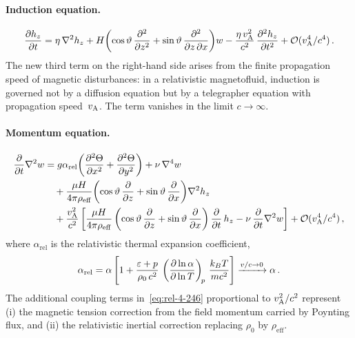 \paragraph{Induction equation.}
\begin{equation}
  \frac{\partial h_{z}}{\partial t}
  = \eta\,\nabla^{2}h_{z}
    + H\!\left(\cos\vartheta\,\frac{\partial^{2}}{\partial z^{2}}
              + \sin\vartheta\,\frac{\partial^{2}}{\partial z\,\partial x}\right)\!w
    - \frac{\eta\,v_{\mathrm{A}}^{2}}{c^{2}}\,
      \frac{\partial^{2} h_{z}}{\partial t^{2}}
    + \mathcal{O}(v_{\mathrm{A}}^{4}/c^{4})\,.
  \label{eq:rel-4-245}
\end{equation}
The new third term on the right-hand side arises from the finite
propagation speed of magnetic disturbances: in a relativistic
magnetofluid, induction is governed not by a diffusion equation but by a
telegrapher equation with propagation speed~$v_{\mathrm{A}}$.  The term vanishes in
the limit $c\to\infty$.

\paragraph{Momentum equation.}
\begin{equation}
\begin{split}
  \frac{\partial}{\partial t}\nabla^{2}w
  &= g\alpha_{\mathrm{rel}}\!
     \left(\frac{\partial^{2}\Theta}{\partial x^{2}}
          + \frac{\partial^{2}\Theta}{\partial y^{2}}\right)
     + \nu\,\nabla^{4}w \\
  &\quad
     + \frac{\mu H}{4\pi\rho_{\mathrm{eff}}}
       \!\left(\cos\vartheta\,\frac{\partial}{\partial z}
              + \sin\vartheta\,\frac{\partial}{\partial x}\right)\!
       \nabla^{2}h_{z} \\
  &\quad
     + \frac{v_{\mathrm{A}}^{2}}{c^{2}}
       \left[\frac{\mu H}{4\pi\rho_{\mathrm{eff}}}
             \left(\cos\vartheta\,\frac{\partial}{\partial z}
                   + \sin\vartheta\,\frac{\partial}{\partial x}\right)
             \frac{\partial}{\partial t}\,h_{z}
             - \nu\,\frac{\partial}{\partial t}\nabla^{2}w
       \right]
     + \mathcal{O}(v_{\mathrm{A}}^{4}/c^{4})\,,
\end{split}
  \label{eq:rel-4-246}
\end{equation}
where $\alpha_{\mathrm{rel}}$ is the relativistic thermal expansion
coefficient,
\begin{equation}
  \alpha_{\mathrm{rel}}
  = \alpha\left[1 + \frac{\varepsilon + p}{\rho_{0}\,c^{2}}\,
    \left(\frac{\partial\ln\alpha}{\partial\ln T}\right)_{\!p}\,
    \frac{k_{B}T}{m c^{2}}\right]
  \xrightarrow{v/c \to 0} \alpha\,.
  \label{eq:rel-alpha}
\end{equation}
The additional coupling terms in~\eqref{eq:rel-4-246} proportional to
$v_{\mathrm{A}}^{2}/c^{2}$ represent (i) the magnetic tension correction from the
field momentum carried by Poynting flux, and (ii) the relativistic
inertial correction replacing $\rho_{0}$ by $\rho_{\mathrm{eff}}$.

